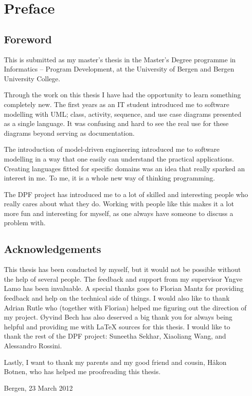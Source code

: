 \chapter*{Preface}
\section*{Foreword}
This is submitted as my master's thesis in the Master's Degree programme in Informatics -- Program Development, at the University of Bergen and Bergen University College.

Through the work on this thesis I have had the opportunity to learn something completely new. The first years as an IT student introduced me to software modelling with UML; class, activity, sequence, and use case diagrams presented as a single language. It was confusing and hard to see the real use for these diagrams beyond serving as documentation. 

The introduction of model-driven engineering introduced me to software modelling in a way that one easily can understand the practical applications. Creating languages fitted for specific domains was an idea that really sparked an interest in me. To me, it is a whole new way of thinking programming. 

The DPF project has introduced me to a lot of skilled and interesting people who really cares about what they do. Working with people like this makes it a lot more fun and interesting for myself, as one always have someone to discuss a problem with.

\section*{Acknowledgements}
This thesis has been conducted by myself, but it would not be possible without the help of several people. The feedback and support from my supervisor Yngve Lamo has been invaluable. A special thanks goes to Florian Mantz for providing feedback and help on the technical side of things. I would also like to thank Adrian Rutle who (together with Florian) helped me figuring out the direction of my project. Øyvind Bech has also deserved a big thank you for always being helpful and providing me with \LaTeX{} sources for this thesis. I would like to thank the rest of the DPF project: Suneetha Sekhar, Xiaoliang Wang, and Alessandro Rossini.

Lastly, I want to thank my parents and my good friend and cousin, Håkon Botnen, who has helped me proofreading this thesis.

\begin{flushright}Bergen, 23 March 2012\end{flushright}